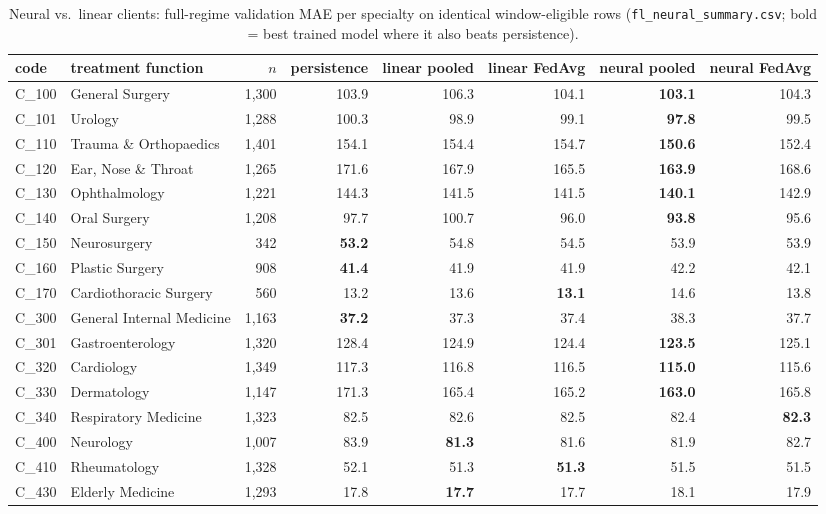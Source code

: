 \documentclass[conference]{IEEEtran}
\begin{document}
\begin{table}[t]
\caption{Neural vs.\ linear clients: full-regime validation MAE per specialty on identical
window-eligible rows (\texttt{fl\_neural\_summary.csv}; bold = best trained model where it also
beats persistence).}
\label{tab:neural}
\centering
\footnotesize
\begin{tabular}{llrrrrrr}
\toprule
code & treatment function & $n$ & persistence & linear pooled & linear FedAvg & neural pooled & neural FedAvg \\
\midrule
C\_100 & General Surgery & 1{,}300 & 103.9 & 106.3 & 104.1 & \textbf{103.1} & 104.3 \\
C\_101 & Urology & 1{,}288 & 100.3 & 98.9 & 99.1 & \textbf{97.8} & 99.5 \\
C\_110 & Trauma \& Orthopaedics & 1{,}401 & 154.1 & 154.4 & 154.7 & \textbf{150.6} & 152.4 \\
C\_120 & Ear, Nose \& Throat & 1{,}265 & 171.6 & 167.9 & 165.5 & \textbf{163.9} & 168.6 \\
C\_130 & Ophthalmology & 1{,}221 & 144.3 & 141.5 & 141.5 & \textbf{140.1} & 142.9 \\
C\_140 & Oral Surgery & 1{,}208 & 97.7 & 100.7 & 96.0 & \textbf{93.8} & 95.6 \\
C\_150 & Neurosurgery & 342 & \textbf{53.2} & 54.8 & 54.5 & 53.9 & 53.9 \\
C\_160 & Plastic Surgery & 908 & \textbf{41.4} & 41.9 & 41.9 & 42.2 & 42.1 \\
C\_170 & Cardiothoracic Surgery & 560 & 13.2 & 13.6 & \textbf{13.1} & 14.6 & 13.8 \\
C\_300 & General Internal Medicine & 1{,}163 & \textbf{37.2} & 37.3 & 37.4 & 38.3 & 37.7 \\
C\_301 & Gastroenterology & 1{,}320 & 128.4 & 124.9 & 124.4 & \textbf{123.5} & 125.1 \\
C\_320 & Cardiology & 1{,}349 & 117.3 & 116.8 & 116.5 & \textbf{115.0} & 115.6 \\
C\_330 & Dermatology & 1{,}147 & 171.3 & 165.4 & 165.2 & \textbf{163.0} & 165.8 \\
C\_340 & Respiratory Medicine & 1{,}323 & 82.5 & 82.6 & 82.5 & 82.4 & \textbf{82.3} \\
C\_400 & Neurology & 1{,}007 & 83.9 & \textbf{81.3} & 81.6 & 81.9 & 82.7 \\
C\_410 & Rheumatology & 1{,}328 & 52.1 & 51.3 & \textbf{51.3} & 51.5 & 51.5 \\
C\_430 & Elderly Medicine & 1{,}293 & 17.8 & \textbf{17.7} & 17.7 & 18.1 & 17.9 \\

\end{tabular}
\end{table}
\end{document}

